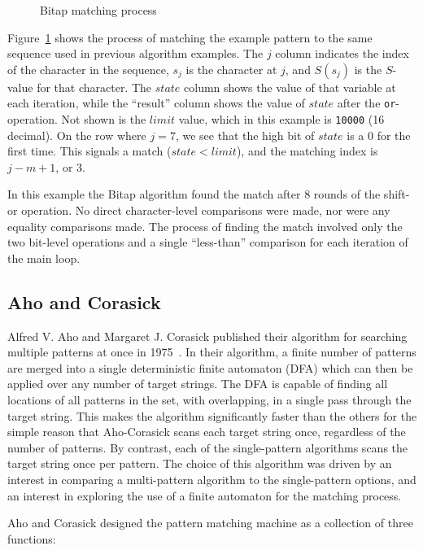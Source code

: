 \begin{figure}[ht]
\centering

\caption{Bitap matching process}
\label{fig:bitap_matching}
\end{figure}

Figure~\ref{fig:bitap_matching} shows the process of matching the example pattern to the same sequence used in previous algorithm examples. The $j$ column indicates the index of the character in the sequence, $s_j$ is the character at $j$, and $S(s_j)$ is the $S$-value for that character. The $state$ column shows the value of that variable at each iteration, while the ``result'' column shows the value of $state$ after the \texttt{or}-operation. Not shown is the $limit$ value, which in this example is \texttt{10000} (16 decimal). On the row where $j = 7$, we see that the high bit of $state$ is a 0 for the first time. This signals a match ($state < limit$), and the matching index is $j - m + 1$, or 3.

In this example the Bitap algorithm found the match after 8 rounds of the shift-or operation. No direct character-level comparisons were made, nor were any equality comparisons made. The process of finding the match involved only the two bit-level operations and a single ``less-than'' comparison for each iteration of the main loop.

\subsection{Aho and Corasick}

Alfred V. Aho and Margaret J. Corasick published their algorithm for searching multiple patterns at once in 1975~\cite{aho}. In their algorithm, a finite number of patterns are merged into a single deterministic finite automaton (DFA) which can then be applied over any number of target strings. The DFA is capable of finding all locations of all patterns in the set, with overlapping, in a single pass through the target string. This makes the algorithm significantly faster than the others for the simple reason that Aho-Corasick scans each target string once, regardless of the number of patterns. By contrast, each of the single-pattern algorithms scans the target string once per pattern. The choice of this algorithm was driven by an interest in comparing a multi-pattern algorithm to the single-pattern options, and an interest in exploring the use of a finite automaton for the matching process.

Aho and Corasick designed the pattern matching machine as a collection of three functions:

